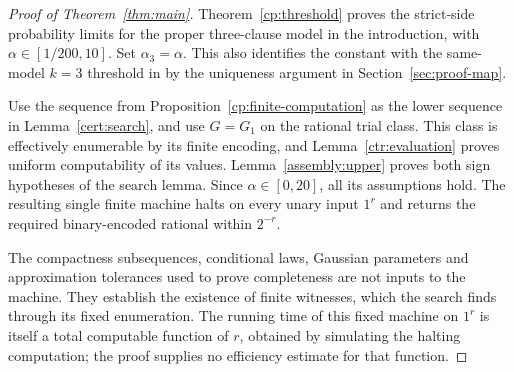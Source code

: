 \begin{proof}[Proof of Theorem~\ref{thm:main}]
Theorem~\ref{cp:threshold} proves the strict-side probability limits for
the proper three-clause model in the introduction, with
$\alpha\in[1/200,10]$. Set $\alpha_3=\alpha$. This also identifies the
constant with the same-model $k=3$ threshold in
\cite[Theorem~1.1]{FixedClauseThreshold} by the uniqueness argument in
Section~\ref{sec:proof-map}.

Use the sequence from Proposition~\ref{cp:finite-computation} as the lower
sequence in Lemma~\ref{cert:search}, and use $G=G_1$ on the rational trial
class. This class is effectively enumerable by its finite encoding, and
Lemma~\ref{ctr:evaluation} proves uniform computability of its values.
Lemma~\ref{assembly:upper} proves both sign hypotheses of the search
lemma. Since $\alpha\in[0,20]$, all its assumptions hold. The resulting
single finite machine halts on every unary input $1^r$ and returns the
required binary-encoded rational within $2^{-r}$.

The compactness subsequences, conditional laws, Gaussian parameters and
approximation tolerances used to prove completeness are not inputs to the
machine. They establish the existence of finite witnesses, which the
search finds through its fixed enumeration. The running time of this fixed
machine on $1^r$ is itself a total computable function of $r$, obtained by
simulating the halting computation; the proof supplies no efficiency
estimate for that function.
\end{proof}
